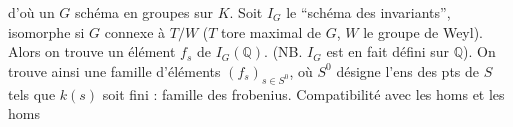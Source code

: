 d'où un $G$ schéma en groupes sur $K$. Soit
$I_G$ le ``schéma des invariants'', isomorphe si $G$ connexe
à $T/W$ ($T$ tore maximal de $G$, $W$ le groupe de Weyl).
Alors on trouve un élément $f_s$ de $I_G(\mathbb{Q})$.
(NB. $I_G$ est en fait défini sur $\mathbb{Q}$).
On trouve
ainsi une famille d'éléments $(f_s)_{s\in S^0}$, où $S^0$
désigne l'ens des pts de $S$ tels que $k(s)$ soit
fini : famille des frobenius. Compatibilité avec
les homs
et les homs
